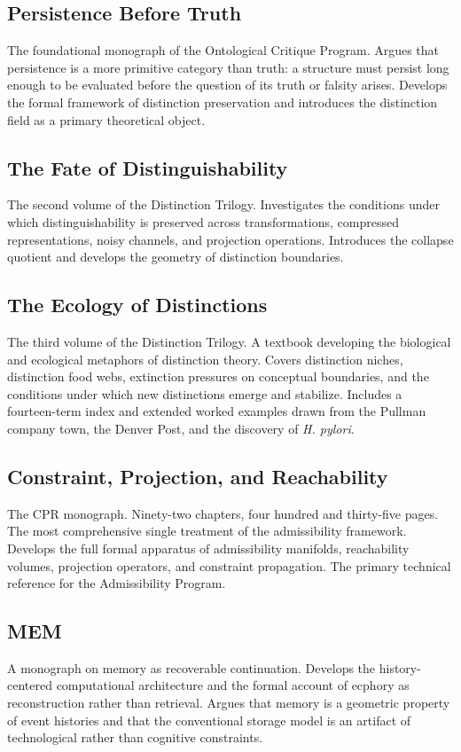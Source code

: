 \documentclass[12pt, openany]{book}
\begin{document}
\subsection{Persistence Before Truth} The foundational monograph of the
Ontological Critique Program. Argues that persistence is a more primitive
category than truth: a structure must persist long enough to be evaluated
before the question of its truth or falsity arises. Develops the formal
framework of distinction preservation and introduces the distinction field
as a primary theoretical object.

\subsection{The Fate of Distinguishability} The second volume of the
Distinction Trilogy. Investigates the conditions under which distinguishability
is preserved across transformations, compressed representations, noisy
channels, and projection operations. Introduces the collapse quotient and
develops the geometry of distinction boundaries.

\subsection{The Ecology of Distinctions} The third volume of the Distinction
Trilogy. A textbook developing the biological and
ecological metaphors of distinction theory. Covers distinction niches,
distinction food webs, extinction pressures on conceptual boundaries,
and the conditions under which new distinctions emerge and stabilize.
Includes a fourteen-term index and extended worked examples drawn from
the Pullman company town, the Denver Post, and the discovery of
\textit{H. pylori}.

\subsection{Constraint, Projection, and Reachability} The CPR monograph.
Ninety-two chapters, four hundred and thirty-five pages. The most
comprehensive single treatment of the admissibility framework. Develops
the full formal apparatus of admissibility manifolds, reachability volumes,
projection operators, and constraint propagation. The primary technical
reference for the Admissibility Program.

\subsection{MEM} A monograph on memory as recoverable continuation.
Develops the history-centered computational architecture and the formal
account of ecphory as reconstruction rather than retrieval. Argues that
memory is a geometric property of event histories and that the conventional
storage model is an artifact of technological rather than cognitive
constraints.
\end{document}
